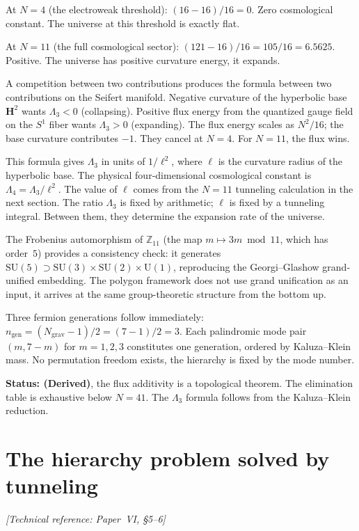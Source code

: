 At $N = 4$ (the electroweak threshold): $(16 - 16)/16 = 0$. Zero
cosmological constant. The universe at this threshold is exactly flat.

At $N = 11$ (the full cosmological sector):
$(121 - 16)/16 = 105/16 = 6.5625$. Positive. The universe has
positive curvature energy, it expands.

A competition between two contributions produces the formula between two contributions on the
Seifert manifold. Negative curvature of the hyperbolic base
$\mathbf{H}^2$ wants $\Lambda_3 < 0$ (collapsing). Positive flux
energy from the quantized gauge field on the $S^1$ fiber wants
$\Lambda_3 > 0$ (expanding). The flux energy scales as $N^2/16$; the
base curvature contributes $-1$. They cancel at $N = 4$. For
$N = 11$, the flux wins.

This formula gives $\Lambda_3$ in units of $1/\ell^2$, where $\ell$
is the curvature radius of the hyperbolic base. The physical
four-dimensional cosmological constant is
$\Lambda_4 = \Lambda_3/\ell^2$. The value of $\ell$ comes from the
$N = 11$ tunneling calculation in the next section. The ratio
$\Lambda_3$ is fixed by arithmetic; $\ell$ is fixed by a tunneling
integral. Between them, they determine the expansion rate of the
universe.

The Frobenius automorphism of $\mathbb{Z}_{11}$ (the map
$m \mapsto 3m \bmod 11$, which has order~$5$) provides a consistency
check: it generates $\mathrm{SU}(5)
\supset \mathrm{SU}(3) \times \mathrm{SU}(2) \times \mathrm{U}(1)$,
reproducing the Georgi--Glashow grand-unified embedding. The polygon
framework does not use grand unification as an input, it arrives at
the same group-theoretic structure from the bottom up.

Three fermion generations follow immediately:
$n_{\mathrm{gen}} = (N_{\mathrm{grav}} - 1)/2 = (7 - 1)/2 = 3$.
Each palindromic mode pair $(m, 7 - m)$ for $m = 1, 2, 3$ constitutes
one generation, ordered by Kaluza--Klein mass. No permutation freedom
exists, the hierarchy is fixed by the mode number.

\textbf{Status: (Derived)}, the flux additivity is a topological
theorem. The elimination table is exhaustive below $N = 41$. The
$\Lambda_3$ formula follows from the Kaluza--Klein reduction.


\section{The hierarchy problem solved by tunneling}
\noindent\textit{[Technical reference: Paper~VI, \S5--6]}

